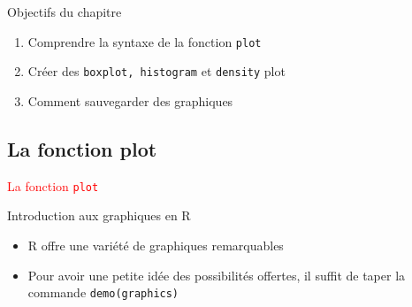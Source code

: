 \documentclass[11pt]{beamer}\usepackage[]{graphicx}\usepackage[]{color}
\newcommand{\code}[1]{\texttt{#1}}
\begin{document}
\begin{frame}[plain]
\hspace*{-1.0cm}\parbox[t]{\textwidth}{
\begin{block}{Objectifs du chapitre}
\begin{enumerate}
\item Comprendre la syntaxe de la fonction \code{plot}
\item Créer des \code{boxplot, histogram} et \code{density} plot
\item Comment sauvegarder des graphiques
\end{enumerate}
\end{block}
}
\end{frame}



\subsection{La fonction plot}

\begin{frame}
 \begin{center}
  \Huge{\textcolor{red}{La fonction \code{plot}}}
 \end{center}
\end{frame}



\begin{frame}[fragile]{Introduction aux graphiques en R}
\begin{itemize}
  \setlength\itemsep{2em}
  \item R offre une variété de graphiques remarquables 
  \item Pour avoir une petite idée des possibilités offertes, il suffit de taper la commande \code{demo(graphics)} 
\end{itemize}
\end{frame}
\end{document}
